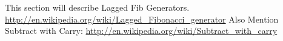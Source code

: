 This section will describe Lagged Fib Generators.
\url{http://en.wikipedia.org/wiki/Lagged_Fibonacci_generator}
Also Mention Subtract with Carry:
\url{http://en.wikipedia.org/wiki/Subtract_with_carry}
